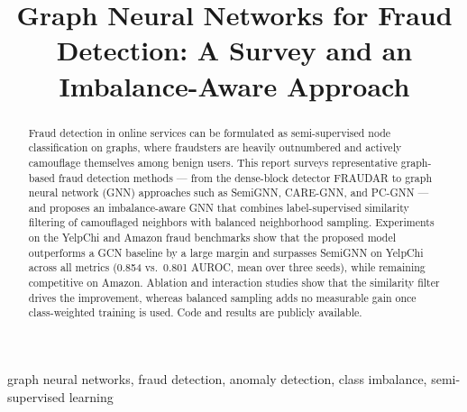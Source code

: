 \documentclass[conference]{IEEEtran}
\begin{document}
\title{Graph Neural Networks for Fraud Detection: A Survey and an
Imbalance-Aware Approach}

\author{
\and
{}
}

\maketitle

\begin{abstract}
Fraud detection in online services can be formulated as semi-supervised node
classification on graphs, where fraudsters are heavily outnumbered and
actively camouflage themselves among benign users. This report surveys
representative graph-based fraud detection methods --- from the dense-block
detector FRAUDAR to graph neural network (GNN) approaches such as SemiGNN,
CARE-GNN, and PC-GNN --- and proposes an imbalance-aware GNN that combines
label-supervised similarity filtering of camouflaged neighbors with balanced
neighborhood sampling. Experiments on the YelpChi and Amazon fraud benchmarks
show that the proposed model outperforms a GCN baseline by a large margin and
surpasses SemiGNN on YelpChi across all metrics (0.854 vs.\ 0.801 AUROC,
mean over three seeds), while remaining competitive on Amazon. Ablation and
interaction studies show that the similarity filter drives the improvement,
whereas balanced sampling adds no measurable gain once class-weighted
training is used. Code and results are publicly available.
\end{abstract}

\begin{IEEEkeywords}
graph neural networks, fraud detection, anomaly detection, class imbalance,
semi-supervised learning
\end{IEEEkeywords}
\end{document}
